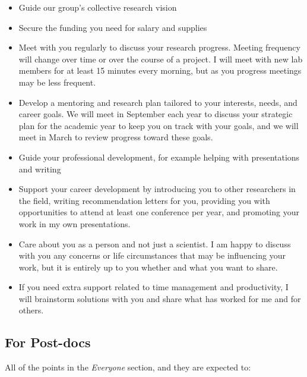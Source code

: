 \documentclass[
]{book}
\providecommand{\tightlist}{%
  \setlength{\itemsep}{0pt}\setlength{\parskip}{0pt}}
\begin{document}
\begin{itemize}
\tightlist
\item
  Guide our group's collective research vision
\item
  Secure the funding you need for salary and supplies
\item
  Meet with you regularly to discuss your research progress. Meeting frequency will change over time or over the course of a project. I will meet with new lab members for at least 15 minutes every morning, but as you progress meetings may be less frequent.
\item
  Develop a mentoring and research plan tailored to your interests, needs, and career goals. We will meet in September each year to discuss your strategic plan for the academic year to keep you on track with your goals, and we will meet in March to review progress toward these goals.
\item
  Guide your professional development, for example helping with presentations and writing
\item
  Support your career development by introducing you to other researchers in the field, writing recommendation letters for you, providing you with opportunities to attend at least one conference per year, and promoting your work in my own presentations.
\item
  Care about you as a person and not just a scientist. I am happy to discuss with you any concerns or life circumstances that may be influencing your work, but it is entirely up to you whether and what you want to share.
\item
  If you need extra support related to time management and productivity, I will brainstorm solutions with you and share what has worked for me and for others.
\end{itemize}

\hypertarget{for-post-docs}{%
\subsection{For Post-docs}\label{for-post-docs}}

All of the points in the \emph{Everyone} section, and they are expected to:
\end{document}
